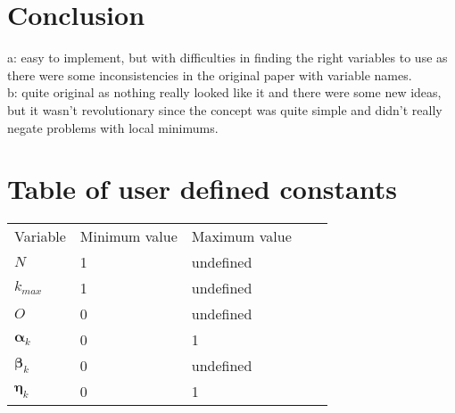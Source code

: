 \documentclass[runningheads]{llncs}
\begin{document}
\section{Conclusion}
a:
easy to implement, but with difficulties in finding the right variables to use as there were some inconsistencies in the original paper with variable names. \\
b:
quite original as nothing really looked like it and there were some new ideas, but it wasn't revolutionary since the concept was quite simple and didn't really negate problems with local minimums.\\







\appendix
\section{Table of user defined constants}
\label{AppA}
\begin{table}[]
\begin{tabular}{|l|l|l|ll}
\cline{1-3}
Variable & Minimum value & Maximum value &  &  \\  \cline{1-3}
$N$ & 1 & undefined & & \\ \cline{1-3}
$ k_{max} $ & 1 & undefined &  &  \\  \cline{1-3}
$ O $   & 0    & undefined &  &   \\  \cline{1-3}
$ \boldsymbol{\alpha}_k $ &  0 & 1 &  &  \\  \cline{1-3}
$ \boldsymbol{\beta}_k $ & 0 & undefined &  &  \\  \cline{1-3}
$ \boldsymbol{\eta}_k $ & 0 & 1 &  & \\  \cline{1-3}
\end{tabular}
\end{table}
\end{document}
